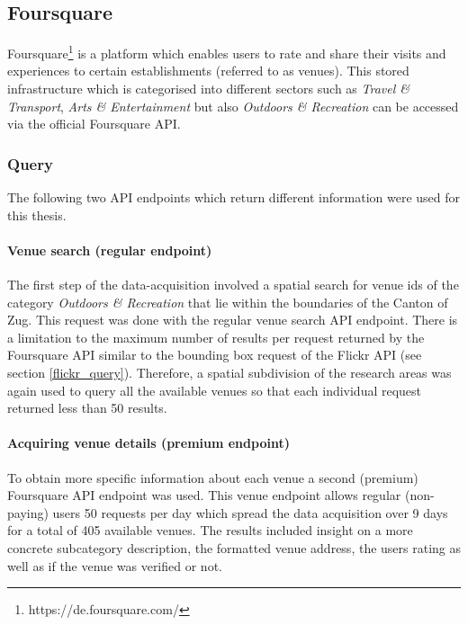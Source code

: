 \subsection{Foursquare} \label{foursquare}
Foursquare\footnote{https://de.foursquare.com/} is a platform which enables users to rate and share their visits and experiences to certain establishments (referred to as venues). This stored infrastructure which is categorised into different sectors such as \textit{Travel \& Transport}, \textit{Arts \& Entertainment} but also \textit{Outdoors \& Recreation} can be accessed via the official Foursquare API.

\subsubsection*{Query} \label{foursquare_query}
The following two API endpoints which return different information were used for this thesis.
\paragraph*{Venue search (regular endpoint)} \label{foursquare_endpoint1}
The first step of the data-acquisition involved a spatial search for venue ids of the category \textit{Outdoors \& Recreation} that lie within the boundaries of the Canton of Zug. This request was done with the regular venue search API endpoint. There is a limitation to the maximum number of results per request returned by the Foursquare API similar to the bounding box request of the Flickr API (see section \ref{flickr_query}). Therefore, a spatial subdivision of the research areas was again used to query all the available venues so that each individual request returned less than 50 results.
\paragraph*{Acquiring venue details (premium endpoint)} \label{foursquare_endpoint2}
To obtain more specific information about each venue a second (premium) Foursquare API endpoint was used. This venue endpoint allows regular (non-paying) users 50 requests per day which spread the data acquisition over 9 days for a total of 405 available venues. The results included insight on a more concrete subcategory description, the formatted venue address, the users rating as well as if the venue was verified or not.

